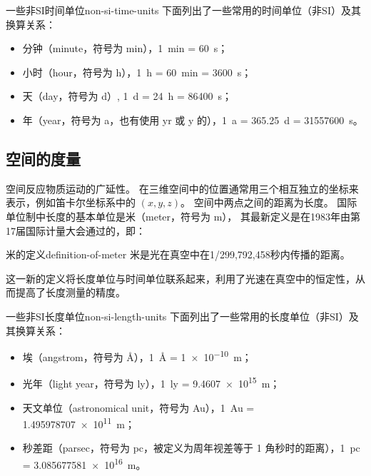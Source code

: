 \begin{note}{一些非SI时间单位}{non-si-time-units}
    下面列出了一些常用的时间单位（非SI）及其换算关系：
    \begin{itemize}
        \item 分钟（minute，符号为 min），\qty{1}{\minute} = \qty{60}{\second}；
        \item 小时（hour，符号为 h），\qty{1}{\hour} = \qty{60}{\minute} = \qty{3600}{\second}；
        \item 天（day，符号为 d）, \qty{1}{d} = \qty{24}{\hour} = \qty{86400}{\second}；
        \item 年（year，符号为 a，也有使用 yr 或 y 的），\qty{1}{a} = \qty{365.25}{d} = \qty{31557600}{\second}。
    \end{itemize}
\end{note}


\subsection{空间的度量}\label{subsec:space-measurement}

空间反应物质运动的广延性。
在三维空间中的位置通常用三个相互独立的坐标来表示，例如笛卡尔坐标系中的 $(x, y, z)$。
空间中两点之间的距离为长度。
国际单位制中长度的基本单位是米（meter，符号为 m），
其最新定义是在1983年由第17届国际计量大会通过的，即：
\begin{definition}{米的定义}{definition-of-meter}
    米是光在真空中在1/299,792,458秒内传播的距离。
\end{definition}
这一新的定义将长度单位与时间单位联系起来，利用了光速在真空中的恒定性，从而提高了长度测量的精度。

\begin{note}{一些非SI长度单位}{non-si-length-units}
    下面列出了一些常用的长度单位（非SI）及其换算关系：
    \begin{itemize}
        \item 埃（angstrom，符号为 \AA），\qty{1}{\angstrom} = \qty{1e-10}{m}；
        \item 光年（light year，符号为 ly），\qty{1}{ly} = \qty{9.4607e15}{m}；
        \item 天文单位（astronomical unit，符号为 Au），\qty{1}{Au} = \qty{1.495978707e11}{m}；
        \item 秒差距（parsec，符号为 pc，被定义为周年视差等于 1 角秒时的距离），\qty{1}{pc} = \qty{3.085677581e16}{m}。
    \end{itemize}
\end{note}

